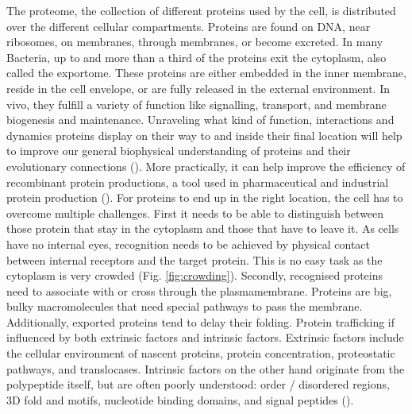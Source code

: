 The proteome,
the collection of different proteins used by the cell, 
is distributed over the different cellular compartments.
Proteins are found on DNA,
near ribosomes,
on membranes,
through membranes,
or become excreted.
In many Bacteria,
up to and more than a third of the proteins exit the cytoplasm,
also called the exportome.
These proteins are either embedded in the inner membrane,
reside in the cell envelope,
or are fully released in the external environment. 
In vivo,
they fulfill a variety of function like 
signalling,
transport,
and membrane biogenesis and maintenance.
Unraveling what kind of function, interactions and dynamics proteins display on their way to and inside their final location
will help to improve our general biophysical understanding of proteins and their evolutionary connections (\cite{loos2019}).
More practically, it can help improve the efficiency of recombinant protein productions,
a tool used in pharmaceutical and industrial protein production (\cite{owji2018}).
For proteins to end up in the right location,
the cell has to overcome multiple challenges.
First it needs to be able to distinguish between those protein that stay in the cytoplasm and those that have to leave it.
As cells have no internal eyes, 
recognition needs to be achieved by physical contact between internal receptors and the target protein.
This is no easy task as the cytoplasm is very crowded (Fig. \ref{fig:crowding}).
Secondly, recognised proteins need to associate with or cross through the plasmamembrane. 
Proteins are big, bulky macromolecules that need special pathways to pass the membrane.
Additionally, exported proteins tend to delay their folding.
Protein trafficking if influenced by both extrinsic factors and intrinsic factors.
Extrinsic factors include 
the cellular environment of nascent proteins,
protein concentration,
proteostatic pathways,
and translocases.
Intrinsic factors on the other hand originate from the polypeptide itself, 
but are often poorly understood:
order / disordered regions,
3D fold and motifs,
nucleotide binding domains,
and signal peptides
(\cite{loos2019}).


